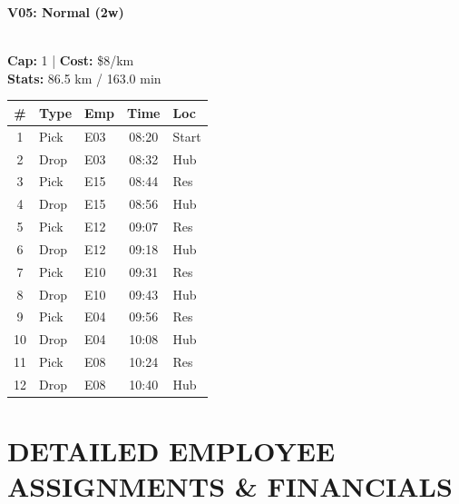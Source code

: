 \documentclass[a4paper,11pt]{article}
\begin{document}
\begin{minipage}[t]{0.32\textwidth}
    \centering
    \colorbox{velorablue}{\parbox{\dimexpr\linewidth-2\fboxsep}{\centering \color{white}\textbf{V05: Normal (2w)}}} \\
    \vspace{0.05cm}
    {\tiny \textbf{Cap:} 1 | \textbf{Cost:} \$8/km \\ \textbf{Stats:} 86.5 km / 163.0 min}
    \vspace{0.05cm}
    
    \renewcommand{\arraystretch}{0.85}
    \setlength{\tabcolsep}{1pt}
    \tiny
    \begin{tabular}{c l l c l}
        \toprule
        \textbf{\#} & \textbf{Type} & \textbf{Emp} & \textbf{Time} & \textbf{Loc} \\
        \midrule
        1 & Pick & E03 & 08:20 & Start \\
        \rowcolor{headergray} 2 & Drop & E03 & 08:32 & Hub \\
        3 & Pick & E15 & 08:44 & Res \\
        \rowcolor{headergray} 4 & Drop & E15 & 08:56 & Hub \\
        5 & Pick & E12 & 09:07 & Res \\
        \rowcolor{headergray} 6 & Drop & E12 & 09:18 & Hub \\
        7 & Pick & E10 & 09:31 & Res \\
        \rowcolor{headergray} 8 & Drop & E10 & 09:43 & Hub \\
        9 & Pick & E04 & 09:56 & Res \\
        \rowcolor{headergray} 10 & Drop & E04 & 10:08 & Hub \\
        11 & Pick & E08 & 10:24 & Res \\
        \rowcolor{headergray} 12 & Drop & E08 & 10:40 & Hub \\
        \bottomrule
    \end{tabular}
\end{minipage}

\vspace{0.2cm}

\section*{\uppercase{\color{velorablue} Detailed Employee Assignments \& Financials}}
\vspace{-0.3cm}
\end{document}
